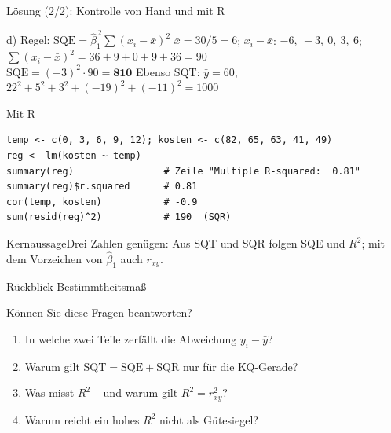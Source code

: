 \documentclass[aspectratio=169,11pt]{beamer}
\newcommand{\kernaussage}[1]{\begin{alertblock}{Kernaussage}#1\end{alertblock}}
\begin{document}
\begin{frame}[fragile]{Lösung (2/2): Kontrolle von Hand und mit R}
  \small\lstset{basicstyle=\ttfamily\footnotesize,aboveskip=2pt,belowskip=2pt}
  \begin{block}{d) Regel: $\text{SQE} = \hat{\beta}_1^{\,2} \sum (x_i - \bar{x})^{2}$}
    $\bar{x} = 30/5 = 6$; \quad $x_i - \bar{x}$: $-6,\ -3,\ 0,\ 3,\ 6$;
    \quad $\sum (x_i - \bar{x})^{2} = 36 + 9 + 0 + 9 + 36 = 90$\\[3pt]
    $\text{SQE} = (-3)^{2} \cdot 90 = \mathbf{810}$ \checkmark \qquad
    Ebenso SQT: $\bar{y} = 60$, \ $22^{2} + 5^{2} + 3^{2} + (-19)^{2} + (-11)^{2} = 1000$ \checkmark
  \end{block}

  \begin{exampleblock}{Mit R}
\begin{lstlisting}
temp <- c(0, 3, 6, 9, 12); kosten <- c(82, 65, 63, 41, 49)
reg <- lm(kosten ~ temp)
summary(reg)                # Zeile "Multiple R-squared:  0.81"
summary(reg)$r.squared      # 0.81
cor(temp, kosten)           # -0.9
sum(resid(reg)^2)           # 190  (SQR)
\end{lstlisting}
  \end{exampleblock}

  \kernaussage{Drei Zahlen genügen: Aus SQT und SQR folgen SQE und $R^{2}$; mit dem
    Vorzeichen von $\hat{\beta}_1$ auch $r_{xy}$.}
\end{frame}

\begin{frame}{Rückblick Bestimmtheitsmaß}
  \begin{block}{Können Sie diese Fragen beantworten?}
    \begin{enumerate}
      \setlength{\itemsep}{3pt}
      \item In welche zwei Teile zerfällt die Abweichung $y_i - \bar{y}$?
      \item Warum gilt $\text{SQT} = \text{SQE} + \text{SQR}$ nur für die KQ-Gerade?
      \item Was misst $R^{2}$ -- und warum gilt $R^{2} = r_{xy}^{2}$?
      \item Warum reicht ein hohes $R^{2}$ nicht als Gütesiegel?
    \end{enumerate}
  \end{block}

  \bigskip

  \begin{center}
  \end{center}
\end{frame}
\end{document}
